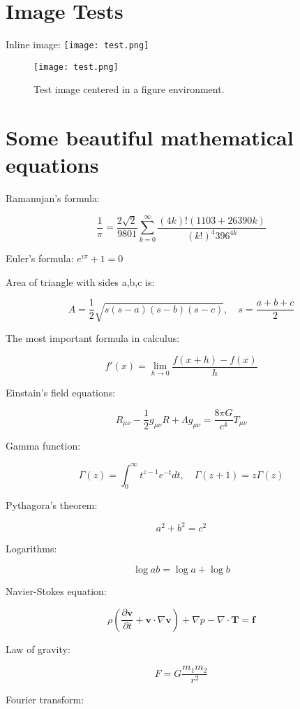 \documentclass{article}
\begin{document}
\section{Image Tests}

Inline image: \texttt{[image: test.png]}

\begin{figure}[h]
    \centering
    \texttt{[image: test.png]}
    \caption{Test image centered in a figure environment.}
    \label{fig:test_image}
\end{figure}

\newpage

\section{Some beautiful mathematical equations}

Ramanujan's formula:

$$\frac{1}{\pi}=\frac{2\sqrt{2}}{9801}\sum_{k=0}^\infty\frac{(4k)! (1103+26390k)}{(k!)^4 396^{4k}}$$

Euler's formula: $e^{i\pi}+1=0$

Area of triangle with sides a,b,c is: 

$$A=\frac{1}{2} \sqrt{s(s-a)(s-b)(s-c)},\quad s=\frac{a+b+c}{2}$$

The most important formula in calculus:

\[
  f'(x)=\lim_{h\to 0}\frac{f(x+h)-f(x)}{h}
\]

Einstain's field equations:

\[
R_{\mu\nu}-\frac{1}{2}g_{\mu\nu}R+\Lambda g_{\mu\nu}=\frac{8\pi G}{c^4}T_{\mu\nu}
\]

Gamma function:

\[
  \Gamma(z) = \int_0^\infty t^{z-1} e^{-t} dt,\quad\Gamma(z+1) = z \Gamma(z)
\]

Pythagora's theorem:

$$a^2+b^2=c^2$$

Logarithms: 

$$\log ab=\log a+\log b$$

Navier-Stokes equation:

$$\rho\left(\frac{\partial \textbf{v}}{\partial t}+\textbf{v}\cdot\nabla\textbf{v}\right)+\nabla p-\nabla\cdot\textbf{T}=\textbf{f}$$

Law of gravity:

$$F=G\frac{m_1m_2}{r^2}$$

Fourier transform:
\end{document}
